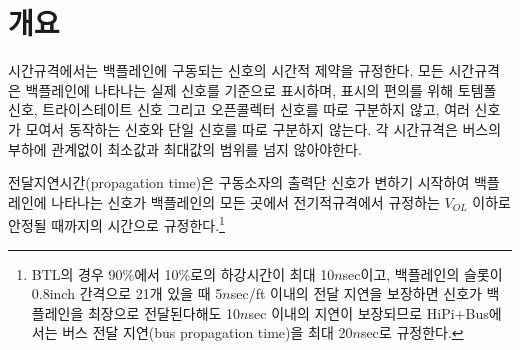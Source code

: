 \section{개요}
시간규격에서는  백플레인에 구동되는 신호의 시간적 제약을 규정한다.
모든 시간규격은 백플레인에 나타나는 실제 신호를 기준으로 표시하며, 표시의 편의를 위해
토템폴 신호, 트라이스테이트 신호 그리고 오픈콜렉터 신호를 따로 구분하지 않고,
여러 신호가 모여서 동작하는 신호와 단일 신호를 따로 구분하지 않는다.
각 시간규격은 버스의 부하에 관계없이 최소값과 최대값의 범위를 넘지 않아야한다.

전달지연시간(propagation time)은 구동소자의 출력단 신호가
변하기 시작하여 백플레인에 나타나는 신호가 백플레인의 모든 곳에서
전기적규격에서 규정하는 $V_{OL}$ 이하로 안정될 때까지의 시간으로 규정한다.\footnote{BTL의 경우
90\%에서 10\%로의 하강시간이 최대 10$n$sec이고, 백플레인의 슬롯이 0.8inch 간격으로
21개 있을 때 5$n$sec/ft 이내의 전달 지연을 보장하면 신호가 백플레인을 최장으로 전달된다해도
10$n$sec 이내의 지연이 보장되므로 HiPi+Bus에서는 버스 전달 지연(bus propagation
time)을 최대 20$n$sec로 규정한다.}
%
